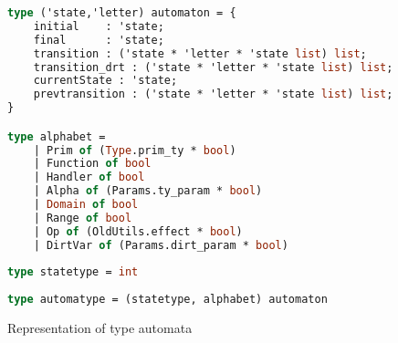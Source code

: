 \begin{figure}
\caption{Representation of type automata}
\label{lst:simplification}
\begin{lstlisting}[language=Caml]
type ('state,'letter) automaton = {
    initial    : 'state;
    final      : 'state;
    transition : ('state * 'letter * 'state list) list;
    transition_drt : ('state * 'letter * 'state list) list;
    currentState : 'state;
    prevtransition : ('state * 'letter * 'state list) list;
}

type alphabet =
    | Prim of (Type.prim_ty * bool)
    | Function of bool
    | Handler of bool
    | Alpha of (Params.ty_param * bool)
    | Domain of bool
    | Range of bool
    | Op of (OldUtils.effect * bool)
    | DirtVar of (Params.dirt_param * bool)
    
type statetype = int
    
type automatype = (statetype, alphabet) automaton
\end{lstlisting}
\end{figure}
